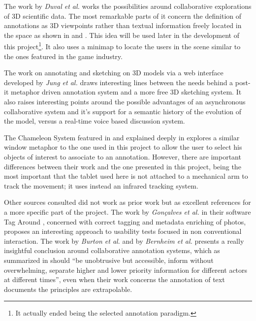 The work by {\em Duval et al.} \cite{Duval} works the possibilities around collaborative explorations of 3D scientific data. The most remarkable parts of it concern the definition of annotations as 3D viewpoints rather than textual information freely located in the space as shown in \cite{Kadobayashi} and \cite{Sonnet}. This idea will be used later in the development of this project\footnote{It actually ended being the selected annotation paradigm.}. It also uses a minimap to locate the users in the scene similar to the ones featured in the game industry.

The work on annotating and sketching on 3D models via a web interface developed by {\em Jung et al.} \cite{Jung} draws interesting lines between the needs behind a post-it metaphor driven annotation system and a more free 3D sketching system. It also raises interesting points around the possible advantages of an asynchronous collaborative system and it's support for a semantic history of the evolution of the model, versus a real-time voice based discussion system.

The Chameleon System featured in \cite{3DUI} and explained deeply in \cite{Tsang} explores a similar window metaphor to the one used in this project to allow the user to select his objects of interest to associate to an annotation. However, there are important differences between their work and the one presented in this project, being the most important that the tablet used here is not attached to a mechanical arm to track the movement; it uses instead an infrared tracking system.

Other sources consulted did not work as prior work but as excellent references for a more specific part of the project. The work by {\em Gonçalves et al.} in their software Tag Around \cite{Goncalves}, concerned with correct tagging and metadata enriching of photos, proposes an interesting approach to usability tests focused in non conventional interaction. The work by {\em Burton et al.}\cite{Burton} and by {\em Bernheim et al.}\cite{Bernheim} presents a really insightful conclusion around collaborative annotation systems, which as summarized in \cite{Jung} should ``be unobtrusive but accessible, inform without overwhelming, separate higher and lower priority information for different actors at different times'', even when their work concerns the annotation of text documents the principles are extrapolable.
